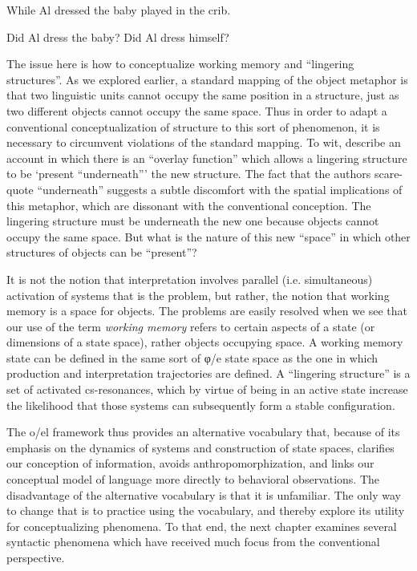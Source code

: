 \ea\label{ex:6:1ter}
{While Al dressed the baby played in the crib.}
\z

\ea
\ea \label{ex:6:2tera} {Did Al dress the baby?}
\ex \label{ex:6:2terb }{Did Al dress himself?}
\z
\z

The issue here is how to conceptualize working memory and “lingering structures”. As we explored earlier, a standard mapping of the object metaphor is that two linguistic units cannot occupy the same position in a structure, just as two different objects cannot occupy the same space. Thus in order to adapt a conventional conceptualization of structure to this sort of phenomenon, it is necessary to circumvent violations of the standard mapping. To wit, \citet{SlatteryEtAl2013} describe an account in which there is an “overlay function” which allows a lingering structure to be ‘present “underneath”’ the new structure. The fact that the authors scare-quote “underneath” suggests a subtle discomfort with the spatial implications of this metaphor, which are dissonant with the conventional conception. The lingering structure must be underneath the new one because objects cannot occupy the same space. But what is the nature of this new “space” in which other structures of objects can be “present”?

It is not the notion that interpretation involves parallel (i.e. simultaneous) activation of systems that is the problem, but rather, the notion that working memory is a space for objects. The problems are easily resolved when we see that our use of the term \textit{working memory} refers to certain aspects of a state (or dimensions of a state space), rather objects occupying space. A working memory state can be defined in the same sort of φ/e state space as the one in which production and interpretation trajectories are defined. A “lingering structure” is a set of activated cs-resonances, which by virtue of being in an active state increase the likelihood that those systems can subsequently form a stable configuration.

The o/el framework thus provides an alternative vocabulary that, because of its emphasis on the dynamics of systems and construction of state spaces, clarifies our conception of information, avoids anthropomorphization, and links our conceptual model of language more directly to behavioral observations. The disadvantage of the alternative vocabulary is that it is unfamiliar. The only way to change that is to practice using the vocabulary, and thereby explore its utility for conceptualizing phenomena. To that end, the next chapter examines several syntactic phenomena which have received much focus from the conventional perspective.  

